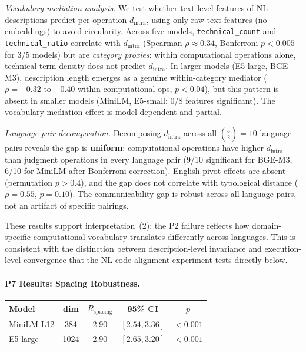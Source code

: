 \documentclass[11pt]{article}
\theoremstyle{definition}
\begin{document}
\textit{Vocabulary mediation analysis.} We test whether text-level features of NL descriptions predict per-operation $d_{\text{intra}}$, using only raw-text features (no embeddings) to avoid circularity. Across five models, \texttt{technical\_count} and \texttt{technical\_ratio} correlate with $d_{\text{intra}}$ (Spearman $\rho \approx 0.34$, Bonferroni $p < 0.005$ for 3/5 models) but are \emph{category proxies}: within computational operations alone, technical term density does not predict $d_{\text{intra}}$. In larger models (E5-large, BGE-M3), description length emerges as a genuine within-category mediator ($\rho = -0.32$ to $-0.40$ within computational ops, $p < 0.04$), but this pattern is absent in smaller models (MiniLM, E5-small: 0/8 features significant). The vocabulary mediation effect is model-dependent and partial.

\textit{Language-pair decomposition.} Decomposing $d_{\text{intra}}$ across all $\binom{5}{2} = 10$ language pairs reveals the gap is \textbf{uniform}: computational operations have higher $d_{\text{intra}}$ than judgment operations in every language pair (9/10 significant for BGE-M3, 6/10 for MiniLM after Bonferroni correction). English-pivot effects are absent (permutation $p > 0.4$), and the gap does not correlate with typological distance ($\rho = 0.55$, $p = 0.10$). The communicability gap is robust across all language pairs, not an artifact of specific pairings.

These results support interpretation~(2): the P2 failure reflects how domain-specific computational vocabulary translates differently across languages. This is consistent with the distinction between description-level invariance and execution-level convergence that the NL-code alignment experiment tests directly below.

\paragraph{P7 Results: Spacing Robustness.}

\begin{table}[h]
\centering
\small
\begin{tabular}{lcccc}
\toprule
\textbf{Model} & \textbf{dim} & $R_{\text{spacing}}$ & \textbf{95\% CI} & $p$ \\
\midrule
MiniLM-L12 & 384 & 2.90 & $[2.54, 3.36]$ & $< 0.001$ \\
E5-large & 1024 & 2.90 & $[2.65, 3.20]$ & $< 0.001$ \\
\bottomrule
\end{tabular}
\end{table}
\end{document}
